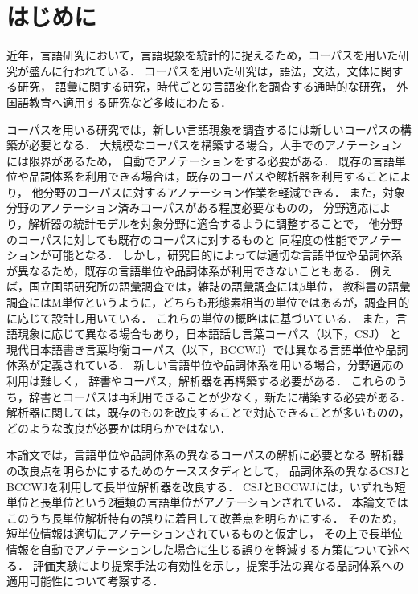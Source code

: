 \documentclass[japanese]{jnlp_1.4}
\begin{document}
\maketitle


\section{はじめに}\label{intro}

近年，言語研究において，言語現象を統計的に捉えるため，コーパスを用いた研究が盛んに行われている．
コーパスを用いた研究は，語法，文法，文体に関する研究\cite{oishi2009,koiso2009}，
語彙に関する研究\cite{tanomura2010}，時代ごとの言語変化を調査する通時的な研究\cite{kondo2012}，
外国語教育へ適用する研究\cite{nakajo2006}など多岐にわたる．

コーパスを用いる研究では，新しい言語現象を調査するには新しいコーパスの構築が必要となる．
大規模なコーパスを構築する場合，人手でのアノテーションには限界があるため，
自動でアノテーションをする必要がある．
既存の言語単位や品詞体系を利用できる場合は，既存のコーパスや解析器を利用することにより，
他分野のコーパスに対するアノテーション作業を軽減できる\cite{kazama2004}．
また，対象分野のアノテーション済みコーパスがある程度必要なものの，
分野適応により，解析器の統計モデルを対象分野に適合するように調整することで，
他分野のコーパスに対しても既存のコーパスに対するものと
同程度の性能でアノテーションが可能となる\cite{jing2007,neubig2011}．
しかし，研究目的によっては適切な言語単位や品詞体系が異なるため，既存の言語単位や品詞体系が利用できないこともある．
例えば，国立国語研究所の語彙調査では，雑誌の語彙調査には$\beta$単位，
教科書の語彙調査にはM単位というように，どちらも形態素相当の単位ではあるが，調査目的に応じて設計し用いている．
これらの単位の概略は\cite{hayashi1982,nakano1998}に基づいている．
また，言語現象に応じて異なる場合もあり，日本語話し言葉コーパス\cite{csj}（以下，CSJ）
と現代日本語書き言葉均衡コーパス\cite{bccwj}（以下，BCCWJ）では異なる言語単位や品詞体系が定義されている．
新しい言語単位や品詞体系を用いる場合，分野適応の利用は難しく，
辞書やコーパス，解析器を再構築する必要がある．
これらのうち，辞書とコーパスは再利用できることが少なく，新たに構築する必要がある．
解析器に関しては，既存のものを改良することで対応できることが多いものの，
どのような改良が必要かは明らかではない．


本論文では，言語単位や品詞体系の異なるコーパスの解析に必要となる
解析器の改良点を明らかにするためのケーススタディとして，
品詞体系の異なるCSJとBCCWJを利用して長単位解析器を改良する．
CSJとBCCWJには，いずれも短単位と長単位という2種類の言語単位がアノテーションされている．
本論文ではこのうち長単位解析特有の誤りに着目して改善点を明らかにする．
そのため，短単位情報は適切にアノテーションされているものと仮定し，
その上で長単位情報を自動でアノテーションした場合に生じる誤りを軽減する方策について述べる．
評価実験により提案手法の有効性を示し，提案手法の異なる品詞体系への適用可能性について考察する．
\end{document}
